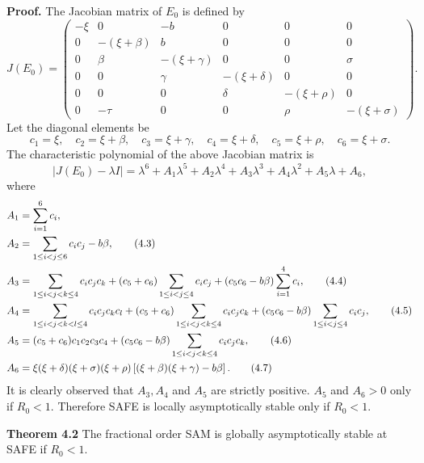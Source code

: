 \documentclass[10pt]{NSP1}
\begin{document}
\textbf{Proof.} The Jacobian matrix of $E_0$ is defined by
\begin{equation}
J(E_0) = \begin{pmatrix}
-\xi & 0 & -b & 0 & 0 & 0 \\
0 & -(\xi + \beta) & b & 0 & 0 & 0 \\
0 & \beta & -(\xi + \gamma) & 0 & 0 & \sigma \\
0 & 0 & \gamma & -(\xi + \delta) & 0 & 0 \\
0 & 0 & 0 & \delta & -(\xi + \rho) & 0 \\
0 & -\tau & 0 & 0 & \rho & -(\xi + \sigma)
\end{pmatrix}.
\tag{4.1}
\end{equation}
Let the diagonal elements be
\begin{equation*}
c_1 = \xi,\quad c_2 = \xi + \beta,\quad c_3 = \xi + \gamma,\quad c_4 = \xi + \delta,\quad c_5 = \xi + \rho,\quad c_6 = \xi + \sigma.
\end{equation*}
The characteristic polynomial of the above Jacobian matrix is
\begin{equation}
\left| J(E_0) - \lambda I \right| = \lambda^6 + A_1 \lambda^5 + A_2 \lambda^4 + A_3 \lambda^3 + A_4 \lambda^2 + A_5 \lambda + A_6,
\tag{4.2}
\end{equation}
where
\begin{align}
A_1 &= \sum_{i=1}^6 c_i, \notag \\
A_2 &= \sum_{1 \le i < j \le 6} c_i c_j - b\beta, \tag{4.3} \\
A_3 &= \sum_{1 \le i < j < k \le 4} c_i c_j c_k + (c_5 + c_6) \sum_{1 \le i < j \le 4} c_i c_j + (c_5 c_6 - b\beta) \sum_{i=1}^4 c_i, \tag{4.4} \\
A_4 &= \sum_{1 \le i < j < k < l \le 4} c_i c_j c_k c_l + (c_5 + c_6) \sum_{1 \le i < j < k \le 4} c_i c_j c_k + (c_5 c_6 - b\beta) \sum_{1 \le i < j \le 4} c_i c_j, \tag{4.5} \\
A_5 &= (c_5 + c_6) c_1 c_2 c_3 c_4 + (c_5 c_6 - b\beta) \sum_{1 \le i < j < k \le 4} c_i c_j c_k, \tag{4.6} \\
A_6 &= \xi (\xi + \delta)(\xi + \sigma)(\xi + \rho) \left[ (\xi + \beta)(\xi + \gamma) - b\beta \right]. \tag{4.7}
\end{align}
It is clearly observed that $A_3, A_4$ and $A_5$ are strictly positive. $A_5$ and $A_6 > 0$ only if $R_0 < 1$. Therefore SAFE is locally asymptotically stable only if $R_0 < 1$.

\textbf{Theorem 4.2} The fractional order SAM is globally asymptotically stable at SAFE if $R_0 < 1$.
\end{document}

